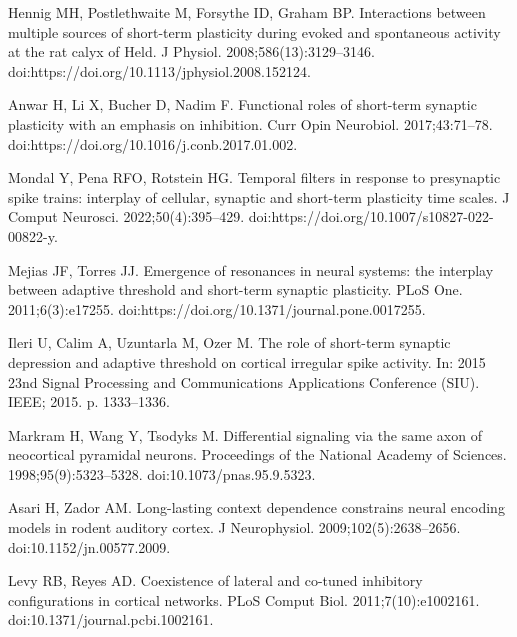 \documentclass[10pt,letterpaper]{article}
\begin{document}
\begin{thebibliography}{100}
  Hennig MH, Postlethwaite M, Forsythe ID, Graham BP.
  \newblock Interactions between multiple sources of short-term plasticity during
    evoked and spontaneous activity at the rat calyx of Held.
  \newblock J Physiol. 2008;586(13):3129--3146.
  \newblock doi:{https://doi.org/10.1113/jphysiol.2008.152124}.
  
  Anwar H, Li X, Bucher D, Nadim F.
  \newblock Functional roles of short-term synaptic plasticity with an emphasis
    on inhibition.
  \newblock Curr Opin Neurobiol. 2017;43:71--78.
  \newblock doi:{https://doi.org/10.1016/j.conb.2017.01.002}.
  
  Mondal Y, Pena RFO, Rotstein HG.
  \newblock Temporal filters in response to presynaptic spike trains: interplay
    of cellular, synaptic and short-term plasticity time scales.
  \newblock J Comput Neurosci. 2022;50(4):395--429.
  \newblock doi:{https://doi.org/10.1007/s10827-022-00822-y}.
  
  Mejias JF, Torres JJ.
  \newblock Emergence of resonances in neural systems: the interplay between
    adaptive threshold and short-term synaptic plasticity.
  \newblock PLoS One. 2011;6(3):e17255.
  \newblock doi:{https://doi.org/10.1371/journal.pone.0017255}.
  
  Ileri U, Calim A, Uzuntarla M, Ozer M.
  \newblock The role of short-term synaptic depression and adaptive threshold on
    cortical irregular spike activity.
  \newblock In: 2015 23nd Signal Processing and Communications Applications
    Conference ({SIU}). IEEE; 2015. p. 1333--1336.
  
  Markram H, Wang Y, Tsodyks M.
  \newblock Differential signaling via the same axon of neocortical pyramidal
    neurons.
  \newblock Proceedings of the National Academy of Sciences.
    1998;95(9):5323--5328.
  \newblock doi:{10.1073/pnas.95.9.5323}.
  
  Asari H, Zador AM.
  \newblock Long-lasting context dependence constrains neural encoding models in
    rodent auditory cortex.
  \newblock J Neurophysiol. 2009;102(5):2638--2656.
  \newblock doi:{10.1152/jn.00577.2009}.
  
  Levy RB, Reyes AD.
  \newblock Coexistence of lateral and co-tuned inhibitory configurations in
    cortical networks.
  \newblock PLoS Comput Biol. 2011;7(10):e1002161.
  \newblock doi:{10.1371/journal.pcbi.1002161}.
  

\end{thebibliography}
\end{document}
